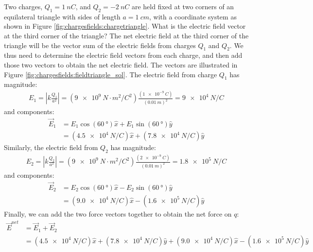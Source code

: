 \begin{example}{\label{ex:chargesfields:epointcharges}Two charges, $Q_1=\SI{1}{nC}$, and $Q_2=\SI{-2}{nC}$ are held fixed at two corners of an equilateral triangle with sides of length $a=\SI{1}{cm}$, with a coordinate system as shown in Figure \ref{fig:chargesfields:chargetriangle}. What is the electric field vector at the third corner of the triangle? 
}
The net electric field at the third corner of the triangle will be the vector sum of the electric fields from charges $Q_1$ and $Q_2$. We thus need to determine the electric field vectors from each charge, and then add those two vectors to obtain the net electric field. The vectors are illustrated in Figure \ref{fig:chargesfields:fieldtriangle_sol}.
The electric field from charge $Q_1$ has magnitude:
\begin{align*}
E_1=\left |k\frac{Q_1}{a^2}\right |=(\SI{9e9}{N\cdot m^2/C^{2}})\frac{(\SI{1e-9}{C})}{(\SI{0.01}{m})^2}=\SI{9e4}{N/C}
\end{align*}
and components:
\begin{align*}
\vec E_1&=E_1\cos(\SI{60}{\degree})\hat x+E_1\sin(\SI{60}{\degree})\hat y\\
&=(\SI{4.5e4}{N/C})\hat x+(\SI{7.8e4}{N/C})\hat y
\end{align*}
Similarly, the electric field from $Q_2$ has magnitude:
\begin{align*}
E_2=\left |k\frac{Q_2}{a^2}\right |=(\SI{9e9}{N\cdot m^2/C^{2}})\frac{(\SI{2e-9}{C})}{(\SI{0.01}{m})^2}=\SI{1.8e5}{N/C}
\end{align*}
and components:
\begin{align*}
\vec E_2&=E_2\cos(\SI{60}{\degree})\hat x-E_2\sin(\SI{60}{\degree})\hat y\\
&=(\SI{9.0e4}{N/C})\hat x-(\SI{1.6e5}{N/C})\hat y
\end{align*}
Finally, we can add the two force vectors together to obtain the net force on $q$:
\begin{align*}
\vec E^{net}&=\vec E_1+\vec E_2\\
&=(\SI{4.5e4}{N/C})\hat x+(\SI{7.8e4}{N/C})\hat y+(\SI{9.0e4}{N/C})\hat x-(\SI{1.6e5}{N/C})\hat y\\

\end{align*}
\end{example}
